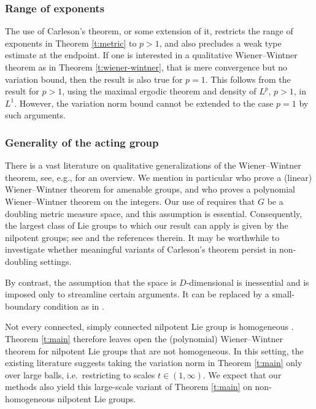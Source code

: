 \documentclass[12pt,reqno,a4paper,dvipsnames]{amsart}
\theoremstyle{plain}
\theoremstyle{definition}
\numberwithin{theorem}{section}
\numberwithin{equation}{section}
\newcommand{\AD}{D}
\begin{document}
\subsubsection{Range of exponents}

The use of Carleson's theorem, or some extension of it, restricts the range of exponents in Theorem \ref{t:metric} to $p > 1$, and also precludes a weak type estimate at the endpoint. If one is interested in a qualitative Wiener--Wintner theorem as in Theorem \ref{t:wiener-wintner}, that is mere convergence but no variation bound, then the result is also true for $p = 1$. This follows from the result for $p > 1$, using the maximal ergodic theorem and density of $L^p$, $p > 1$, in $L^1$. However, the variation norm bound cannot be extended to the case $p = 1$ by such arguments.


\subsubsection{Generality of the acting group}
There is a vast literature on qualitative generalizations of the Wiener--Wintner theorem, see, e.g., \cite{assani-survey,eisner-farkas} for an overview. We mention in particular \cite{ornstein-weiss, zk-return} who prove a (linear) Wiener--Wintner theorem for amenable groups, and \cite{lesigne2} who proves a polynomial Wiener--Wintner theorem on the integers. Our use of \cite{beckeretal} requires that $G$ be a doubling metric measure space, and this assumption is essential. Consequently, the largest class of Lie groups to which our result can apply is given by the nilpotent groups; see \cite[Section~4]{nevo} and the references therein. It may be worthwhile to investigate whether meaningful variants of Carleson's theorem persist in non-doubling settings. 

By contrast, the assumption that the space is $\AD$-dimensional is inessential and is imposed only to streamline certain arguments. It can be replaced by a small-boundary condition as in \cite{zk-var-trunc}.

Not every connected, simply connected nilpotent Lie group is homogeneous \cite{dyer}. Theorem \ref{t:main} therefore leaves open the (polynomial) Wiener--Wintner theorem for nilpotent Lie groups that are not homogeneous. In this setting, the existing literature suggests taking the variation norm in Theorem \ref{t:main} only over large balls, i.e.\ restricting to scales $t\in(1,\infty)$. We expect that our methods also yield this large-scale variant of Theorem \ref{t:main} on non-homogeneous nilpotent Lie groups.
\end{document}
